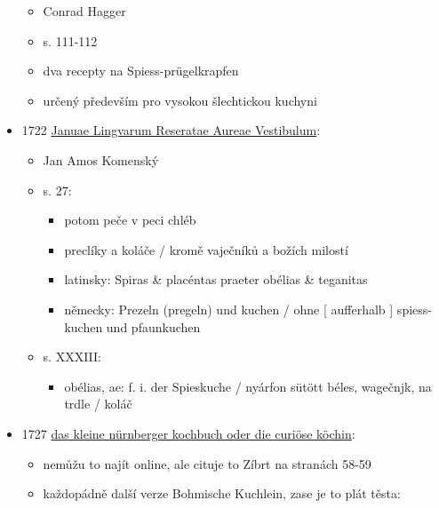\begin{itemize}
  \begin{itemize}
  \tightlist
  \item
    Conrad Hagger
  \item
    s. 111-112
  \item
    dva recepty na Spiess-prügelkrapfen
  \item
    určený především pro vysokou šlechtickou kuchyni
  \end{itemize}
\item
  1722
  \href{https://ceskadigitalniknihovna.cz/uuid/uuid:53e484e8-3646-4b98-a954-6abfe5313ce0}{Januae
  Lingvarum Reseratae Aureae Vestibulum}:

  \begin{itemize}
  \tightlist
  \item
    Jan Amos Komenský
  \item
    s. 27:

    \begin{itemize}
    \tightlist
    \item
      potom peče v peci chléb
    \item
      preclíky a koláče / kromě vaječníků a božích milostí
    \item
      latinsky: Spiras \& placéntas praeter obélias \& teganitas
    \item
      německy: Prezeln (pregeln) und kuchen / ohne {[} aufferhalb {]}
      spiess-kuchen und pfaunkuchen
    \end{itemize}
  \item
    s. XXXIII:

    \begin{itemize}
    \tightlist
    \item
      obélias, ae: f. i. der Spieskuche / nyárfon sütött béles,
      wagečnjk, na trdle / koláč
    \end{itemize}
  \end{itemize}
\item
  1727
  \href{https://ndk.cz/uuid/uuid:b59a1ff0-9f23-11ea-b6e0-005056827e51}{das
  kleine nürnberger kochbuch oder die curiöse köchin}:

  \begin{itemize}
  \tightlist
  \item
    nemůžu to najít online, ale cituje to Zíbrt na stranách 58-59
  \item
    každopádně další verze Bohmische Kuchlein, zase je to plát těsta:


\end{itemize}
\end{itemize}
